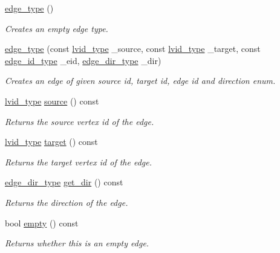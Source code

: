 \begin{DoxyCompactItemize}
\item 
\hyperlink{classsaedb_1_1graph__storage_1_1edge__type_a4abbb7194585fbaea07258db1a7fd75e}{edge\-\_\-type} ()
\begin{DoxyCompactList}\small\item\em Creates an empty edge type. \end{DoxyCompactList}\item 
\hyperlink{classsaedb_1_1graph__storage_1_1edge__type_a03fe69a737920b3a94c4190918a47d89}{edge\-\_\-type} (const \hyperlink{classsaedb_1_1graph__storage_a147a907accd64bb1f803a423d04dd04b}{lvid\-\_\-type} \-\_\-source, const \hyperlink{classsaedb_1_1graph__storage_a147a907accd64bb1f803a423d04dd04b}{lvid\-\_\-type} \-\_\-target, const \hyperlink{classsaedb_1_1graph__storage_a7861f26a1e724120e58d9feba4da37a1}{edge\-\_\-id\-\_\-type} \-\_\-eid, \hyperlink{namespacesaedb_adf5ad13c09a48fb2f42f8e7348ea3ac3}{edge\-\_\-dir\-\_\-type} \-\_\-dir)
\begin{DoxyCompactList}\small\item\em Creates an edge of given source id, target id, edge id and direction enum. \end{DoxyCompactList}\item 
\hyperlink{classsaedb_1_1graph__storage_a147a907accd64bb1f803a423d04dd04b}{lvid\-\_\-type} \hyperlink{classsaedb_1_1graph__storage_1_1edge__type_a4fc9dbc968eede5311b8edb26b4c2e10}{source} () const 
\begin{DoxyCompactList}\small\item\em Returns the source vertex id of the edge. \end{DoxyCompactList}\item 
\hyperlink{classsaedb_1_1graph__storage_a147a907accd64bb1f803a423d04dd04b}{lvid\-\_\-type} \hyperlink{classsaedb_1_1graph__storage_1_1edge__type_a2a9d0b9610a3521fe27b51bf03e6b0c2}{target} () const 
\begin{DoxyCompactList}\small\item\em Returns the target vertex id of the edge. \end{DoxyCompactList}\item 
\hyperlink{namespacesaedb_adf5ad13c09a48fb2f42f8e7348ea3ac3}{edge\-\_\-dir\-\_\-type} \hyperlink{classsaedb_1_1graph__storage_1_1edge__type_a375c2e16d1fddf6bf7bc3aa679a86b1b}{get\-\_\-dir} () const 
\begin{DoxyCompactList}\small\item\em Returns the direction of the edge. \end{DoxyCompactList}\item 
bool \hyperlink{classsaedb_1_1graph__storage_1_1edge__type_ab727ad76be91ca4445c878f9a20a786e}{empty} () const 
\begin{DoxyCompactList}\small\item\em Returns whether this is an empty edge. \end{DoxyCompactList}\end{DoxyCompactItemize}
